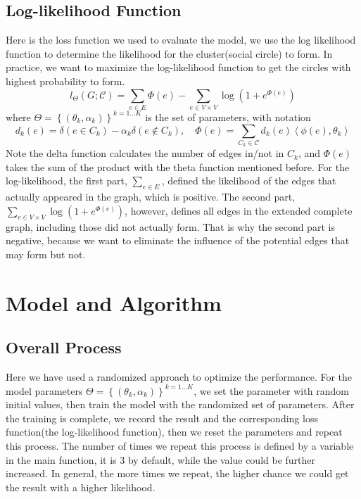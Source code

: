 \documentclass[12pt,a4paper]{article}
\begin{document}
\subsection*{Log-likelihood Function}
\par Here is the loss function we used to evaluate the model, we use the log likelihood function to determine the likelihood for the cluster(social circle) to form. In practice, we want to maximize the log-likelihood function to get the circles with highest probability to form.
\[
    l_{\Theta}(G ; \mathcal{C})=\sum_{e \in E} \Phi(e)-\sum_{e \in V \times V} \log \left(1+e^{\Phi(e)}\right)
\]
where $\Theta=\left\{\left(\theta_{k}, \alpha_{k}\right)\right\}^{k=1 \ldots K}$ is the set of parameters, with notation
\[
    d_{k}(e)=\delta\left(e \in C_{k}\right)-\alpha_{k} \delta\left(e \notin C_{k}\right), \quad \Phi(e)=\sum_{C_{k} \in \mathcal{C}} d_{k}(e)\left\langle\phi(e), \theta_{k}\right\rangle
\]
Note the delta function calculates the number of edges in/not in $C_k$, and $\Phi(e)$ takes the sum of the product with the theta function mentioned before. 
For the log-likelihood, the first part, $\sum_{e \in E}$, defined the likelihood of the edges that actually appeared in the graph, which is positive. The second part, $\sum_{e \in V \times V} \log \left(1+e^{\Phi(e)}\right)$, however, defines all edges in the extended complete graph, including those did not actually form. That is why the second part is negative, because we want to eliminate the influence of the potential edges that may form but not.

\section*{Model and Algorithm}
\subsection*{Overall Process}
Here we have used a randomized approach to optimize the performance. For the model parameters $\Theta=\left\{\left(\theta_{k}, \alpha_{k}\right)\right\}^{k=1 \ldots K}$, we set the parameter with random initial values, then train the model with the randomized set of parameters. After the training is complete, we record the result and the corresponding loss function(the log-likelihood function), then we reset the parameters and repeat this process. The number of times we repeat this process is defined by a variable in the main function, it is 3 by default, while the value could be further increased. In general, the more times we repeat, the higher chance we could get the result with a higher likelihood.
\end{document}
